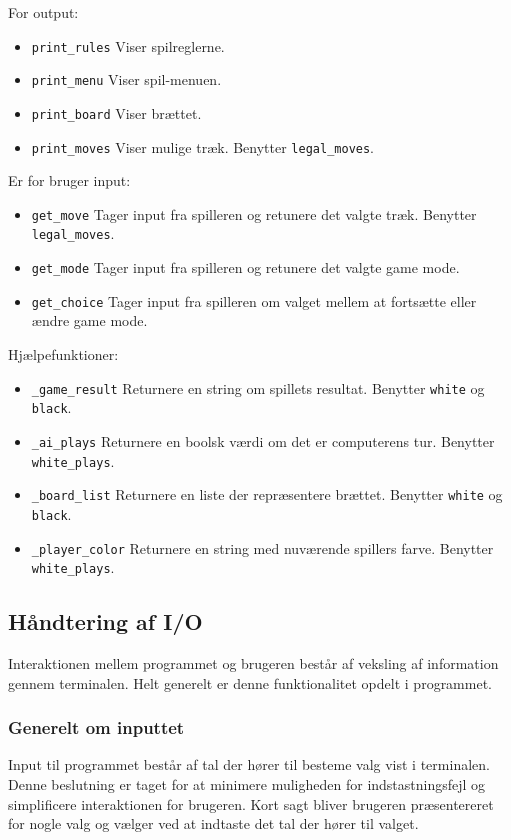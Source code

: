 \documentclass{article}
\begin{document}
For output:
\begin{itemize}
    \item \texttt{print\_rules} Viser spilreglerne.
    \item \texttt{print\_menu} Viser spil-menuen.
    \item \texttt{print\_board} Viser brættet.
    \item \texttt{print\_moves} Viser mulige træk. Benytter \texttt{legal\_moves}.
\end{itemize}

Er for bruger input:
\begin{itemize}
    \item \texttt{get\_move} Tager input fra spilleren og retunere det valgte træk. Benytter \texttt{legal\_moves}.
    \item \texttt{get\_mode} Tager input fra spilleren og retunere det valgte game mode.
    \item \texttt{get\_choice} Tager input fra spilleren om valget mellem at fortsætte eller ændre game mode.
\end{itemize}

Hjælpefunktioner:
\begin{itemize}
    \item \texttt{\_game\_result} Returnere en string om spillets resultat. Benytter \texttt{white} og \texttt{black}.
    \item \texttt{\_ai\_plays} Returnere en boolsk værdi om det er computerens tur. Benytter \texttt{white\_plays}.
    \item \texttt{\_board\_list} Returnere en liste der repræsentere brættet. Benytter \texttt{white} og \texttt{black}.
    \item \texttt{\_player\_color} Returnere en string med nuværende spillers farve. Benytter \texttt{white\_plays}.
\end{itemize}

\subsection{Håndtering af I/O}
Interaktionen mellem programmet og brugeren består af veksling af information
gennem terminalen. Helt generelt er denne funktionalitet opdelt i programmet.

\subsubsection{Generelt om inputtet}
Input til programmet består af tal der hører til besteme valg vist i terminalen. 
Denne beslutning er taget for at minimere muligheden for indstastningsfejl
og simplificere interaktionen for brugeren.
Kort sagt bliver brugeren præsentereret for nogle valg og vælger ved 
at indtaste det tal der hører til valget.
\end{document}
